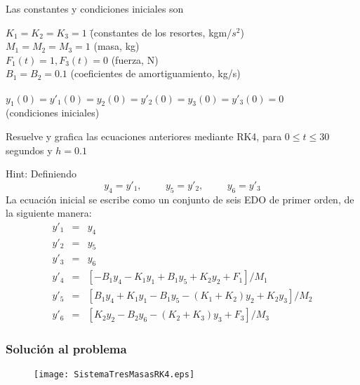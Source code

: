 \begin{frame}
Las constantes y condiciones iniciales son
\fontsize{12}{12}\selectfont
\begin{tabbing}
$K_{1} = K_{2} = K_{3} = 1$ \hspace{1.2cm} \= (constantes de los resortes, kgm/$s^{2}$) \\
$M_{1} = M_{2} = M_{3} = 1$ \> (masa, kg) \\
$F_{1}(t) = 1, F_{3}(t) = 0$ \> (fuerza, N) \\
$B_{1} = B_{2} =0.1$ \> (coeficientes de amortiguamiento, kg/s) \\
\\
$y_{1}(0) = y'_{1}(0) = y_{2}(0) = y'_{2}(0) = y_{3}(0) = y'_{3}(0) = 0$ \\
\> (condiciones iniciales)
\end{tabbing}
Resuelve y grafica las ecuaciones anteriores mediante RK4, para $0 \leq t \leq 30$ segundos y $h=0.1$ \\
\end{frame}
\begin{frame}
Hint: Definiendo
\[ y_{4} = y'_{1}, \hspace{1cm} y_{5} = y'_{2}, \hspace{1cm} y_{6} = y'_{3} \]
La ecuación inicial se escribe como un conjunto de seis EDO de primer orden, de la siguiente manera:
\begin{eqnarray*}
y'_{1} & = & y_{4} \\
y'_{2} & = & y_{5} \\
y'_{3} & = & y_{6} \\
y'_{4} & = & \left[ -B_{1} y_{4} - K_{1} y_{1} + B_{1} y_{5} + K_{2} y_{2} + F_{1} \right] / M_{1} \\
y'_{5} & = & \left[ B_{1} y_{4} + K_{1} y_{1} - B_{1} y_{5} - \left( K_{1} + K_{2} \right) y_{2} + K_{2} y_{3} \right] / M_{2}\\
y'_{6} & = & \left[ K_{2} y_{2} - B_{2} y_{6} - \left( K_{2} + K_{3} \right)y_{3} + F_{3} \right] / M_{3}
\end{eqnarray*}
\end{frame}
\begin{frame}[fragile]
\frametitle{Soluci\'{o}n al problema}
\begin{figure}
	\centering
	\texttt{[image: SistemaTresMasasRK4.eps]} 
\end{figure}
\end{frame}
